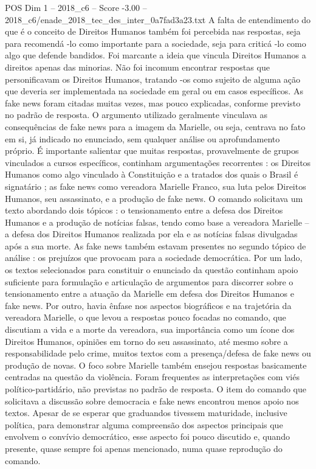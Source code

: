 \begin{textsample}{POS Dim 1 – 2018\_c6 – Score -3.00 – 2018\_c6/enade\_2018\_tec\_des\_inter\_0a7fad3a23.txt}
A falta de entendimento do que é o conceito de Direitos Humanos também foi percebida nas respostas, seja para recomendá -lo como importante para a sociedade, seja para criticá -lo como algo que defende bandidos.
Foi marcante a ideia que vincula Direitos Humanos a direitos apenas das minorias.
Não foi incomum encontrar respostas que personificavam os Direitos Humanos, tratando -os como sujeito de alguma ação que deveria ser implementada na sociedade em geral ou em casos específicos.
As fake news foram citadas muitas vezes, mas pouco explicadas, conforme previsto no padrão de resposta.
O argumento utilizado geralmente vinculava as consequências de fake news para a imagem da Marielle, ou seja, centrava no fato em si, já indicado no enunciado, sem qualquer análise ou aprofundamento próprio.
É importante salientar que muitas respostas, provavelmente de grupos vinculados a cursos específicos, continham argumentações recorrentes : os Direitos Humanos como algo vinculado à Constituição e a tratados dos quais o Brasil é signatário ; as fake news como vereadora Marielle Franco, sua luta pelos Direitos Humanos, seu assassinato, e a produção de fake news.
O comando solicitava um texto abordando dois tópicos : o tensionamento entre a defesa dos Direitos Humanos e a produção de notícias falsas, tendo como base a vereadora Marielle – a defesa dos Direitos Humanos realizada por ela e as notícias falsas divulgadas após a sua morte.
As fake news também estavam presentes no segundo tópico de análise : os prejuízos que provocam para a sociedade democrática.
Por um lado, os textos selecionados para constituir o enunciado da questão continham apoio suficiente para formulação e articulação de argumentos para discorrer sobre o tensionamento entre a atuação da Marielle em defesa dos Direitos Humanos e fake news.
Por outro, havia ênfase nos aspectos biográficos e na trajetória da vereadora Marielle, o que levou a respostas pouco focadas no comando, que discutiam a vida e a morte da vereadora, sua importância como um ícone dos Direitos Humanos, opiniões em torno do seu assassinato, até mesmo sobre a responsabilidade pelo crime, muitos textos com a presença/defesa de fake news ou produção de novas.
O foco sobre Marielle também ensejou respostas basicamente centradas na questão da violência.
Foram frequentes as interpretações com viés político-partidário, não previstas no padrão de resposta.
O item do comando que solicitava a discussão sobre democracia e fake news encontrou menos apoio nos textos.
Apesar de se esperar que graduandos tivessem maturidade, inclusive política, para demonstrar alguma compreensão dos aspectos principais que envolvem o convívio democrático, esse aspecto foi pouco discutido e, quando presente, quase sempre foi apenas mencionado, numa quase reprodução do comando.

\end{textsample}
